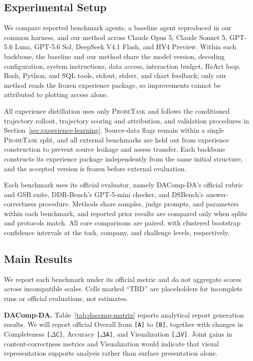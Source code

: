 \documentclass{article}
\newcommand{\probe}{\textsc{ProbeTask}}
\begin{document}
\subsection{Experimental Setup}
\label{sec:main-exp-setup}

We compare reported benchmark agents, a baseline agent reproduced in our common harness, and our method across Claude Opus 5, Claude Sonnet 5, GPT-5.6 Luna, GPT-5.6 Sol, DeepSeek V4.1 Flash, and HY4 Preview.
Within each backbone, the baseline and our method share the model version, decoding configuration, system instructions, data access, interaction budget, ReAct loop, Bash, Python, and SQL tools, stdout, stderr, and chart feedback; only our method reads the frozen experience package, so improvements cannot be attributed to plotting access alone.

All experience distillation uses only \probe{} and follows the conditioned trajectory rollout, trajectory scoring and attribution, and validation procedures in Section~\ref{sec:experience-learning}.
Source-data flags remain within a single \probe{} split, and all external benchmarks are held out from experience construction to prevent source leakage and assess transfer.
Each backbone constructs its experience package independently from the same initial structure, and the accepted version is frozen before external evaluation.

Each benchmark uses its official evaluator, namely DAComp-DA's official rubric and GSB suite, DDR-Bench's GPT-5-mini checker, and DSBench's answer-correctness procedure.
Methods share samples, judge prompts, and parameters within each benchmark, and reported prior results are compared only when splits and protocols match.
All core comparisons are paired, with clustered bootstrap confidence intervals at the task, company, and challenge levels, respectively.

\subsection{Main Results}
\label{sec:main-results}

We report each benchmark under its official metric and do not aggregate scores across incompatible scales.
Cells marked ``TBD'' are placeholders for incomplete runs or official evaluations, not estimates.

\noindent\textbf{DAComp-DA.}
Table~\ref{tab:dacomp-matrix} reports analytical report generation results.
We will report official Overall from \texttt{[A]} to \texttt{[B]}, together with changes in Completeness \texttt{[$\Delta$C]}, Accuracy \texttt{[$\Delta$A]}, and Visualization \texttt{[$\Delta$V]}.
Joint gains in content-correctness metrics and Visualization would indicate that visual representation supports analysis rather than surface presentation alone.
\end{document}
